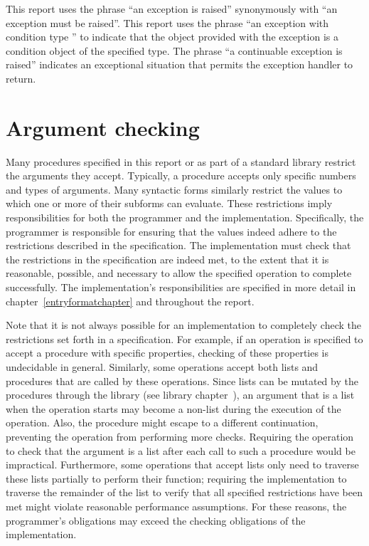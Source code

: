 This report uses the phrase ``an exception is raised'' synonymously
with ``an exception must be raised''.
This report uses the phrase ``an exception with condition type ''
to indicate that the object provided with the
exception is a condition object of the specified type.
The phrase ``a continuable exception is raised'' indicates an
exceptional situation that permits the exception handler to return.

\section{Argument checking}
\label{argumentcheckingsection}

Many procedures specified in this report or as part of a
standard library restrict the arguments they accept.
Typically, a procedure accepts only specific numbers and types of arguments.
Many syntactic forms similarly restrict the values to which one or
more of their subforms can evaluate.
These restrictions imply responsibilities for
both the programmer and the implementation.
Specifically, the programmer is responsible for ensuring
that the values indeed adhere to the restrictions described
in the specification.  The implementation must check
that the restrictions in the specification are indeed met, to the
extent that it is reasonable, possible, and necessary to allow the
specified operation to complete successfully.  The implementation's
responsibilities are specified in more detail in
chapter~\ref{entryformatchapter} and throughout the report.

Note that it is not always possible for an implementation to completely check
the restrictions set forth in a specification.  For example, if an
operation is specified to accept a procedure with specific properties,
checking of these properties is undecidable in general.  Similarly,
some operations accept both lists and procedures that are
called by these operations.  Since lists can be mutated by the procedures
through the  library (see library
chapter~), an argument that is a list
when the operation starts may become a non-list during the execution of the operation.
Also, the procedure might escape to a different continuation,
preventing the operation from performing more checks.
Requiring the operation to check that the argument is a list after
each call to such a procedure would be impractical.  Furthermore, some
operations that accept lists only need to traverse these lists
partially to perform their function; requiring the implementation to
traverse the remainder of the list to verify that all specified
restrictions have been met might
violate reasonable performance assumptions.  For these reasons, the
programmer's obligations may exceed the checking obligations of the
implementation.

